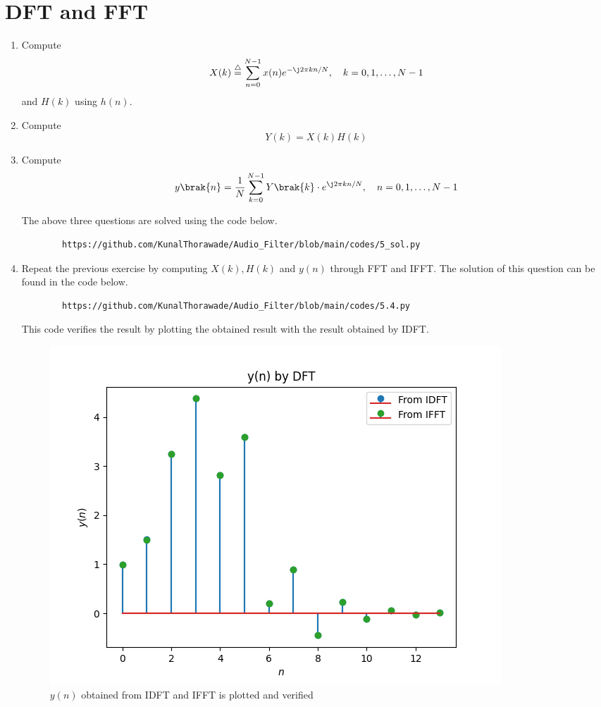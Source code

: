 \documentclass[journal,12pt,twocolumn]{IEEEtran}
\newcommand{\define}{\stackrel{\triangle}{=}}
\theoremstyle{remark}
\begin{document}
\section{DFT and FFT}
\begin{enumerate}[label=\thesection.\arabic*]
	\item
		Compute
		\begin{equation}
			X(k) \define \sum _{n=0}^{N-1}x(n) e^{-\j2\pi kn/N}, \quad k = 0,1,\dots, N-1
		\end{equation}
		and $H(k)$ using $h(n)$.
	\item Compute 
		\begin{equation}
			Y(k) = X(k)H(k)
			\label{eq:fp}
		\end{equation}
	\item Compute
		\begin{equation}
			y\brak{n}={\frac {1}{N}}\sum _{k=0}^{N-1}Y\brak{k}\cdot e^{\j 2\pi kn/N},\quad n = 0,1,\dots, N-1
			\label{eq:inv-ft}
		\end{equation}

		\solution The above three questions are solved using the code below.
		\begin{lstlisting}
		https://github.com/KunalThorawade/Audio_Filter/blob/main/codes/5_sol.py
		\end{lstlisting}

	\item Repeat the previous exercise by computing $X(k), H(k)$ and $y(n)$ through FFT and IFFT.
		\solution The solution of this question can be found in the code below.
		\begin{lstlisting}
		https://github.com/KunalThorawade/Audio_Filter/blob/main/codes/5.4.py
		\end{lstlisting}
		This code verifies the result by plotting the obtained result with the result obtained by IDFT.
		\begin{figure}[H]
			\centering
			\includegraphics[width=\columnwidth]{figs/yn_verf_5.4.png}
			\caption{$y(n)$ obtained from IDFT and IFFT is plotted and verified}
			\label{fig:yn_verf_5.4}
		\end{figure}


\end{enumerate}
\end{document}
